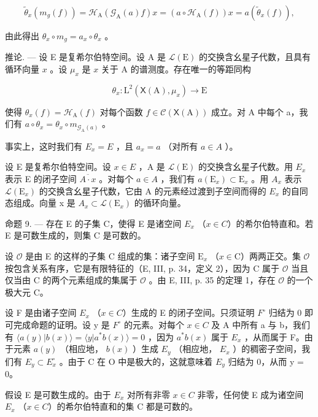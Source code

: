 \[
\widetilde {\theta} _ {x} (m _ {g} (f)) = \mathcal {H} _ {\mathrm{A}} (\mathcal {G} _ {\mathrm{A}} (a) f) x = (a \circ \mathcal {H} _ {\mathrm{A}} (f)) x = a (\widetilde {\theta} _ {x} (f)),
\]

由此得出 \(\theta_x \circ m_g = a_x \circ \theta_x\) 。

推论. — 设 E 是复希尔伯特空间。设 A 是 \(\mathcal{L}(\mathrm{E})\) 的交换含幺星子代数，且具有循环向量 \(x\) 。设 \(\mu_x\) 是 \(x\) 关于 A 的谱测度。存在唯一的等距同构

\[
\theta_ {x} \colon \mathrm{L} ^ {2} (\mathsf {X} (\mathrm{A}), \mu_ {x}) \to \mathrm{E}
\]

使得 \(\theta_x(f) = \mathcal{H}_{\mathrm{A}}(f)\) 对每个函数 \(f \in \mathcal{C}(\mathsf{X}(\mathrm{A}))\) 成立。对 A 中每个 a，我们有 \(a \circ \theta_x = \theta_x \circ m_{\mathcal{G}_{\mathrm{A}}(a)}\) 。

事实上，这时我们有 \(E_{x}=E\) ，且 \(a_{x}=a\) （对所有 \(a\in A\) ）。

设 E 是复希尔伯特空间。设 \(x \in E\) ，A 是 \(\mathcal{L}(\mathrm{E})\) 的交换含幺星子代数。用 \(E_{x}\) 表示 E 的闭子空间 \(\overline{A \cdot x}\) 。对每个 \(a \in A\) ，我们有 \(a(\mathrm{E}_{x}) \subset \mathrm{E}_{x}\) 。用 \(A_{x}\) 表示 \(\mathcal{L}(\mathrm{E}_{x})\) 的交换含幺星子代数，它由 A 的元素经过渡到子空间而得的 \(E_{x}\) 的自同态组成。向量 x 是 \(A_{x} \subset \mathcal{L}(\mathrm{E}_{x})\) 的循环向量。

命题 9. --- 存在 E 的子集 C，使得 E 是诸空间 \(E_{x}\) （\(x \in C\)）的希尔伯特直和。若 E 是可数生成的，则集 C 是可数的。

设 \(\mathcal{O}\) 是由 E 的这样的子集 C 组成的集：诸子空间 \(\mathrm{E}_x\) （\(x\in \mathrm{C}\)）两两正交。集 \(\mathcal{O}\) 按包含关系有序，它是有限特征的（E, III, p. 34，定义 2），因为 C 属于 \(\mathcal{O}\) 当且仅当由 C 的两个元素组成的集属于 \(\mathcal{O}\) 。由 E, III, p. 35 的定理 1，存在 \(\mathcal{O}\) 的一个极大元 C。

设 F 是由诸子空间 \(E_{x}\) （\(x \in C\)）生成的 E 的闭子空间。只须证明 \(F^{\circ}\) 归结为 0 即可完成命题的证明。设 y 是 \(F^{\circ}\) 的元素。对每个 \(x \in C\) 及 A 中所有 a 与 b，我们有 \(\langle a(y) | b(x) \rangle = \langle y | a^{*}b(x) \rangle = 0\) ，因为 \(a^{*}b(x)\) 属于 \(E_{x}\) ，从而属于 F。由于元素 \(a(y)\) （相应地， \(b(x)\) ）生成 \(E_{y}\) （相应地， \(E_{x}\) ）的稠密子空间，我们有 \(E_{y} \subset E_{x}^{\circ}\) 。由于 C 在 O 中是极大的，这就意味着 \(E_{y}\) 归结为 0，从而 y = 0。

假设 E 是可数生成的。由于 \(E_{x}\) 对所有非零 \(x \in C\) 非零，任何使 E 成为诸空间 \(E_{x}\) （\(x \in C\)）的希尔伯特直和的集 C 都是可数的。

